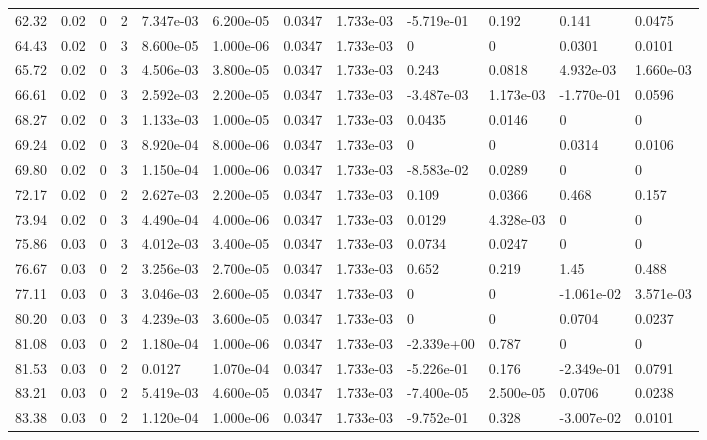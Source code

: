 \documentclass[preview]{standalone}
\begin{document}
{{{\begin{tabular}{L{1.2cm}C{1.2cm} C{0.3cm}C{0.5cm} C{1.4cm}C{1.4cm} C{1.4cm}C{1.4cm} C{1.6cm}C{1.6cm} C{1.6cm}C{1.6cm}}
  62.32  &  0.02  & 0     &  2 &  7.347e-03  & 6.200e-05  &  0.0347&   1.733e-03& -5.719e-01 & 0.192   &  0.141 & 0.0475  \\ 
  64.43  &  0.02  & 0     &  3 &  8.600e-05  & 1.000e-06  &  0.0347&   1.733e-03& 0 & 0   &  0.0301 & 0.0101  \\ 
  65.72  &  0.02  & 0     &  3 &  4.506e-03  & 3.800e-05  &  0.0347&   1.733e-03& 0.243 & 0.0818   &  4.932e-03 & 1.660e-03  \\ 
  66.61  &  0.02  & 0     &  3 &  2.592e-03  & 2.200e-05  &  0.0347&   1.733e-03& -3.487e-03 & 1.173e-03   &  -1.770e-01 & 0.0596  \\ 
  68.27  &  0.02  & 0     &  3 &  1.133e-03  & 1.000e-05  &  0.0347&   1.733e-03& 0.0435 & 0.0146   &  0 & 0  \\ 
  69.24  &  0.02  & 0     &  3 &  8.920e-04  & 8.000e-06  &  0.0347&   1.733e-03& 0 & 0   &  0.0314 & 0.0106  \\ 
  69.80  &  0.02  & 0     &  3 &  1.150e-04  & 1.000e-06  &  0.0347&   1.733e-03& -8.583e-02 & 0.0289   &  0 & 0  \\ 
  72.17  &  0.02  & 0     &  2 &  2.627e-03  & 2.200e-05  &  0.0347&   1.733e-03& 0.109 & 0.0366   &  0.468 & 0.157  \\ 
  73.94  &  0.02  & 0     &  3 &  4.490e-04  & 4.000e-06  &  0.0347&   1.733e-03& 0.0129 & 4.328e-03   &  0 & 0  \\ 
  75.86  &  0.03  & 0     &  3 &  4.012e-03  & 3.400e-05  &  0.0347&   1.733e-03& 0.0734 & 0.0247   &  0 & 0  \\ 
  76.67  &  0.03  & 0     &  2 &  3.256e-03  & 2.700e-05  &  0.0347&   1.733e-03& 0.652 & 0.219   &  1.45 & 0.488  \\ 
  77.11  &  0.03  & 0     &  3 &  3.046e-03  & 2.600e-05  &  0.0347&   1.733e-03& 0 & 0   &  -1.061e-02 & 3.571e-03  \\ 
  80.20  &  0.03  & 0     &  3 &  4.239e-03  & 3.600e-05  &  0.0347&   1.733e-03& 0 & 0   &  0.0704 & 0.0237  \\ 
  81.08  &  0.03  & 0     &  2 &  1.180e-04  & 1.000e-06  &  0.0347&   1.733e-03& -2.339e+00 & 0.787   &  0 & 0  \\ 
  81.53  &  0.03  & 0     &  2 &  0.0127  & 1.070e-04  &  0.0347&   1.733e-03& -5.226e-01 & 0.176   &  -2.349e-01 & 0.0791  \\ 
  83.21  &  0.03  & 0     &  2 &  5.419e-03  & 4.600e-05  &  0.0347&   1.733e-03& -7.400e-05 & 2.500e-05   &  0.0706 & 0.0238  \\ 
  83.38  &  0.03  & 0     &  2 &  1.120e-04  & 1.000e-06  &  0.0347&   1.733e-03& -9.752e-01 & 0.328   &  -3.007e-02 & 0.0101  \\ 

\end{tabular}}}}
\end{document}
